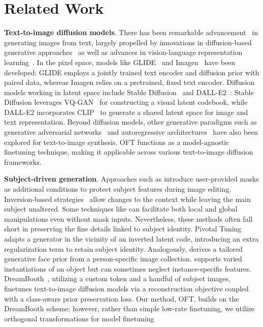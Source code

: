 \section{Related Work}

\textbf{Text-to-image diffusion models}. There has been remarkable advancement~\cite{saharia2022photorealistic,ramesh2022hierarchical,rombach2022high,gu2022vector,nichol2022glide} in generating images from text, largely propelled by innovations in diffusion-based generative approaches~\cite{ho2020denoising,song2021score,song2021denoising,dhariwal2021diffusion} as well as advances in vision-language representation learning~\cite{su2020vlbert,lu2019vilbert,radford2021learning,wang2021simvlm,li2022blip,li2023blip,alayrac2022flamingo,schuhmann2022laion}. In the pixel space, models like GLIDE~\cite{nichol2022glide} and Imagen~\cite{saharia2022photorealistic} have been developed: GLIDE employs a jointly trained text encoder and diffusion prior with paired data, whereas Imagen relies on a pretrained, fixed text encoder. Diffusion models working in latent space include Stable Diffusion~\cite{rombach2022high} and DALL-E2~\cite{ramesh2022hierarchical}: Stable Diffusion leverages VQ-GAN~\cite{esser2021taming} for constructing a visual latent codebook, while DALL-E2 incorporates CLIP~\cite{radford2021learning} to generate a shared latent space for image and text representation. Beyond diffusion models, other generative paradigms such as generative adversarial networks~\cite{reed2016generative,zhang2017stackgan,xu2018attngan,li2019controllable} and autoregressive architectures~\cite{ramesh2021zero,ding2021cogview,wu2022nuwa,yuscaling} have also been explored for text-to-image synthesis. OFT functions as a model-agnostic finetuning technique, making it applicable across various text-to-image diffusion frameworks.

\textbf{Subject-driven generation}. Approaches such as \cite{avrahami2022blended,nichol2022glide} introduce user-provided masks as additional conditions to protect subject features during image editing. Inversion-based strategies~\cite{choi2021ilvr,dhariwal2021diffusion,ramesh2022hierarchical,gal2022image} allow changes to the context while leaving the main subject unaltered. Some techniques like \cite{hertz2022prompt} can facilitate both local and global manipulations even without mask inputs. Nevertheless, these methods often fall short in preserving the fine details linked to subject identity. Pivotal Tuning~\cite{roich2022pivotal} adapts a generator in the vicinity of an inverted latent code, introducing an extra regularization term to retain subject identity. Analogously, \cite{nitzan2022mystyle} derives a tailored generative face prior from a person-specific image collection. \cite{casanova2021instance} supports varied instantiations of an object but can sometimes neglect instance-specific features. DreamBooth~\cite{ruiz2023dreambooth}, utilizing a custom token and a handful of subject images, finetunes text-to-image diffusion models via a reconstruction objective coupled with a class-aware prior preservation loss. Our method, OFT, builds on the DreamBooth scheme; however, rather than simple low-rate finetuning, we utilize orthogonal transformations for model finetuning


